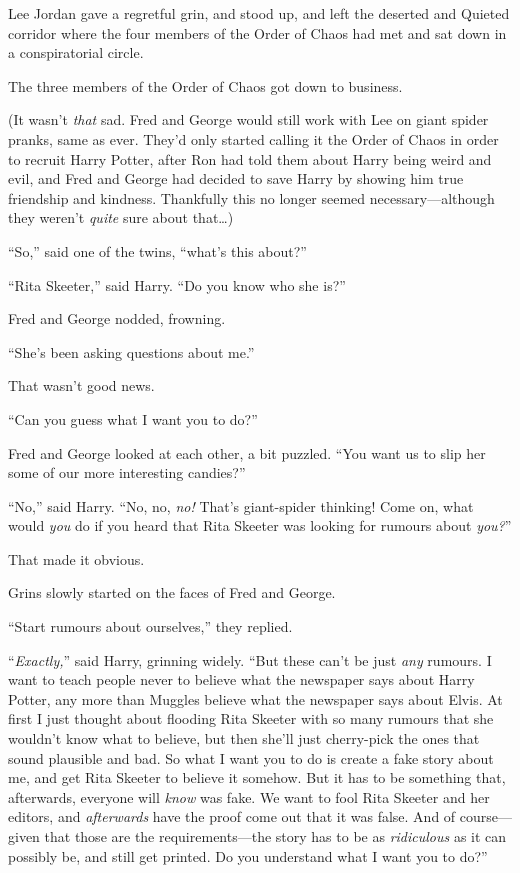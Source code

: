 Lee Jordan gave a regretful grin, and stood up, and left the deserted and Quieted corridor where the four members of the Order of Chaos had met and sat down in a conspiratorial circle.

The three members of the Order of Chaos got down to business.

(It wasn’t \emph{that} sad. Fred and George would still work with Lee on giant spider pranks, same as ever. They’d only started calling it the Order of Chaos in order to recruit Harry Potter, after Ron had told them about Harry being weird and evil, and Fred and George had decided to save Harry by showing him true friendship and kindness. Thankfully this no longer seemed necessary—although they weren’t \emph{quite} sure about that…)

“So,” said one of the twins, “what’s this about?”

“Rita Skeeter,” said Harry. “Do you know who she is?”

Fred and George nodded, frowning.

“She’s been asking questions about me.”

That wasn’t good news.

“Can you guess what I want you to do?”

Fred and George looked at each other, a bit puzzled. “You want us to slip her some of our more interesting candies?”

“No,” said Harry. “No, no, \emph{no!} That’s giant-spider thinking! Come on, what would \emph{you} do if you heard that Rita Skeeter was looking for rumours about \emph{you?}”

That made it obvious.

Grins slowly started on the faces of Fred and George.

“Start rumours about ourselves,” they replied.

“\emph{Exactly,}” said Harry, grinning widely. “But these can’t be just \emph{any} rumours. I want to teach people never to believe what the newspaper says about Harry Potter, any more than Muggles believe what the newspaper says about Elvis. At first I just thought about flooding Rita Skeeter with so many rumours that she wouldn’t know what to believe, but then she’ll just cherry-pick the ones that sound plausible and bad. So what I want you to do is create a fake story about me, and get Rita Skeeter to believe it somehow. But it has to be something that, afterwards, everyone will \emph{know} was fake. We want to fool Rita Skeeter and her editors, and \emph{afterwards} have the proof come out that it was false. And of course—given that those are the requirements—the story has to be as \emph{ridiculous} as it can possibly be, and still get printed. Do you understand what I want you to do?”

